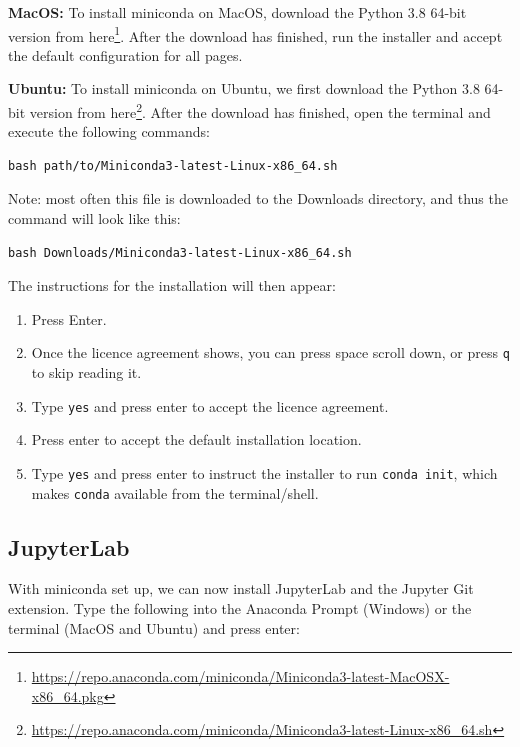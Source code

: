 \documentclass[
]{krantz}
\providecommand{\tightlist}{%
  \setlength{\itemsep}{0pt}\setlength{\parskip}{0pt}}
\renewenvironment{quote}{\begin{VF}}{\end{VF}}
\renewcommand{\href}[2]{#2\footnote{\url{#1}}}
\begin{document}
\textbf{MacOS:} To install miniconda on MacOS, download
the \href{https://repo.anaconda.com/miniconda/Miniconda3-latest-MacOSX-x86_64.pkg}{Python 3.8 64-bit version from here}.
After the download has finished, run the installer and accept the default
configuration for all pages.

\textbf{Ubuntu:} To install miniconda on Ubuntu, we first download
the \href{https://repo.anaconda.com/miniconda/Miniconda3-latest-Linux-x86_64.sh}{Python 3.8 64-bit version from here}.
After the download has finished, open the terminal and execute the following
commands:

\begin{verbatim}
bash path/to/Miniconda3-latest-Linux-x86_64.sh
\end{verbatim}

\begin{quote}
Note: most often this file is downloaded to the Downloads directory, and thus the command will look like this:

\begin{verbatim}
bash Downloads/Miniconda3-latest-Linux-x86_64.sh
\end{verbatim}
\end{quote}

The instructions for the installation will then appear:

\begin{enumerate}
\def\labelenumi{(\arabic{enumi})}
\tightlist
\item
  Press Enter.
\item
  Once the licence agreement shows, you can press space scroll down, or press \texttt{q} to skip reading it.
\item
  Type \texttt{yes} and press enter to accept the licence agreement.
\item
  Press enter to accept the default installation location.
\item
  Type \texttt{yes} and press enter to instruct the installer to run \texttt{conda\ init}, which makes \texttt{conda} available from the terminal/shell.
\end{enumerate}

\hypertarget{jupyterlab}{%
\subsection{JupyterLab}\label{jupyterlab}}

With miniconda set up, we can now install JupyterLab and the Jupyter Git extension.
Type the following into the Anaconda Prompt (Windows) or the terminal (MacOS and Ubuntu) and press enter:
\end{document}
